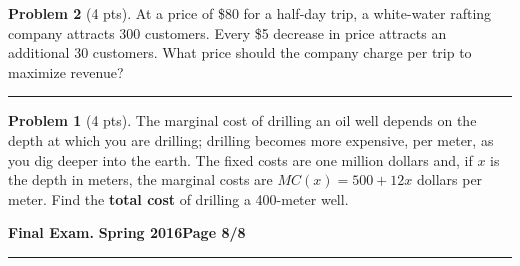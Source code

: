 \documentclass[12pt]{article}
\theoremstyle{definition}
\newtheorem{problem}{Problem}
\begin{document}
\begin{problem}[4 pts]
At a price of \$80 for a half-day trip, a white-water rafting company attracts 300 customers.  Every \$5 decrease in price attracts an additional 30 customers.  What price should the company charge per trip to maximize revenue?
\vspace{7cm}
\hrule

\begin{problem}[4 pts]
The marginal cost of drilling an oil well depends on the depth at which you are drilling; drilling becomes more expensive, per meter, as you dig deeper into the earth.  The fixed costs are one million dollars and, if $x$ is the depth in meters, the marginal costs are $MC(x) = 500 + 12x$ dollars per meter.  Find the \textbf{total cost} of drilling a 400-meter well.
\end{problem}

\end{problem}

\newpage

\hfill{\large\bf Final Exam.}\hfill{\large\bf
  Spring 2016}\hfill{\large\bf Page 8/8}\hrule
\end{document}
